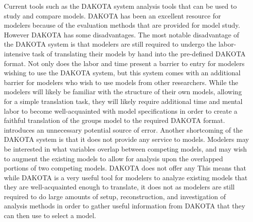 Current tools such as the DAKOTA system  \ctm{(}\cite{adams2009dakota}\ctm{)} 
analysis tools that can be used to study and compare models. DAKOTA has been an excellent resource for modelers because of the 
evaluation methods that are provided %
for model study. However DAKOTA has some disadvantages. The most notable disadvantage of the DAKOTA system is that modelers are still required to undergo the labor-intensive task of translating their models by hand into the pre-defined DAKOTA format. Not only does the labor and time present a barrier to entry for modelers wishing to use the DAKOTA system, but this system comes with an additional barrier for modelers who wish to use models from other researchers. While the modelers will likely be familiar with the structure of their own models, allowing for a simple translation task, they will likely require additional time and mental labor to become well-acquainted with %
model specifications 
in order to create a faithful translation of the groups model to the required DAKOTA format. 
introduces an unnecessary potential source of error. Another shortcoming of the DAKOTA system is that it does not provide any service to  models. Modelers may be interested in what variables overlap between competing models, and may wish to augment the existing models to allow for analysis upon the overlapped portions of two competing models. 
DAKOTA does not offer any  %
This means that while DAKOTA is a very useful tool for modelers to analyze existing models that they are well-acquainted enough to translate, it does not 
as modelers are still required to do large amounts of setup, reconstruction, and investigation of analysis methods in order to gather useful information from DAKOTA that they can then use to select a model.

